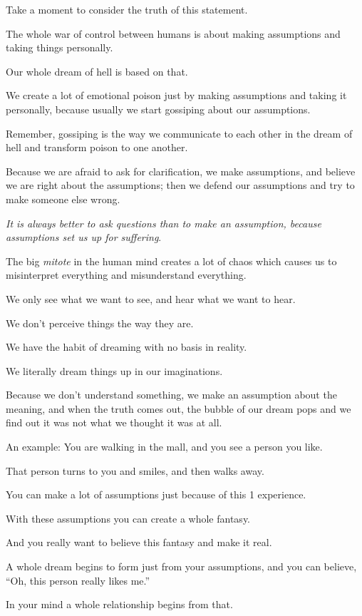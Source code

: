 \documentclass{article}
\numberwithin{equation}{section}
\begin{document}
Take a moment to consider the truth of this statement.

The whole war of control between humans is about making assumptions and taking things personally.

Our whole dream of hell is based on that.

%
We create a lot of emotional poison just by making assumptions and taking it personally, because usually we start gossiping about our assumptions.

Remember, gossiping is the way we communicate to each other in the dream of hell and transform poison to one another.

Because we are afraid to ask for clarification, we make assumptions, and believe we are right about the assumptions; then we defend our assumptions and try to make someone else wrong.

\textit{It is always better to ask questions than to make an assumption, because assumptions set us up for suffering}.

%
The big \textit{mitote} in the human mind creates a lot of chaos which causes us to misinterpret everything and misunderstand everything.

We only see what we want to see, and hear what we want to hear.

We don't perceive things the way they are.

We have the habit of dreaming with no basis in reality.

We literally dream things up in our imaginations.

Because we don't understand something, we make an assumption about the meaning, and when the truth comes out, the bubble of our dream pops and we find out it was not what we thought it was at all.

%
An example: You are walking in the mall, and you see a person you like.

That person turns to you and smiles, and then walks away.

You can make a lot of assumptions just because of this 1 experience.

With these assumptions you can create a whole fantasy.

And you really want to believe this fantasy and make it real.

A whole dream begins to form just from your assumptions, and you can believe, ``Oh, this person really likes me.''

In your mind a whole relationship begins from that.
\end{document}

